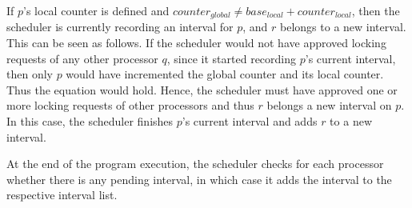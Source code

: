 If $p$'s local counter is defined and $counter_{global} \neq base_{local} + counter_{local}$, then the scheduler is currently recording an interval for $p$, and $r$ belongs to a new interval. This can be seen as follows. If the scheduler would not have approved locking requests of any other processor $q$, since it started recording $p$'s current interval, then only $p$ would have incremented the global counter and its local counter. Thus the equation would hold. Hence, the scheduler must have approved one or more locking requests of other processors and thus $r$ belongs a new interval on $p$. In this case, the scheduler finishes $p$'s current interval and adds $r$ to a new interval. 

At the end of the program execution, the scheduler checks for each processor whether there is any pending interval, in which case it adds the interval to the respective interval list.

